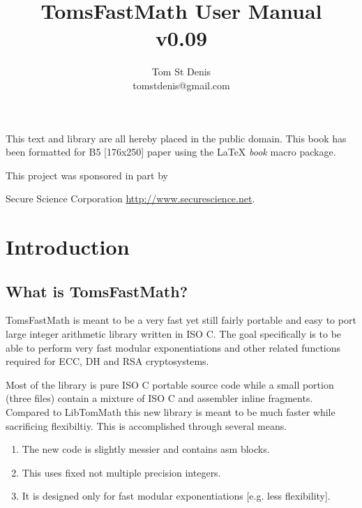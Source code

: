 \documentclass[b5paper]{book}
\begin{document}
\frontmatter
\pagestyle{empty}
\title{TomsFastMath User Manual \\ v0.09}
\author{Tom St Denis \\ tomstdenis@gmail.com}
\maketitle
This text and library are all hereby placed in the public domain.  This book has been formatted for B5 
[176x250] paper using the \LaTeX{} {\em book} macro package.

\vspace{13cm}

\begin{flushleft}This project was sponsored in part by  

Secure Science Corporation \url{http://www.securescience.net}.
\end{flushleft}

\tableofcontents
\listoffigures
\mainmatter
\pagestyle{headings}
\chapter{Introduction}
\section{What is TomsFastMath?}

TomsFastMath is meant to be a very fast yet still fairly portable and easy to port large
integer arithmetic library written in ISO C.  The goal specifically is to be able to perform
very fast modular exponentiations and other related functions required for ECC, DH and RSA
cryptosystems.

Most of the library is pure ISO C portable source code while a small portion (three files) contain
a mixture of ISO C and assembler inline fragments.  Compared to LibTomMath this new library is 
meant to be much faster while sacrificing flexibiltiy.  This is accomplished through several means.

\begin{enumerate}
   \item The new code is slightly messier and contains asm blocks.
   \item This uses fixed not multiple precision integers.  
   \item It is designed only for fast modular exponentiations [e.g. less flexibility].
\end{enumerate}
\end{document}
